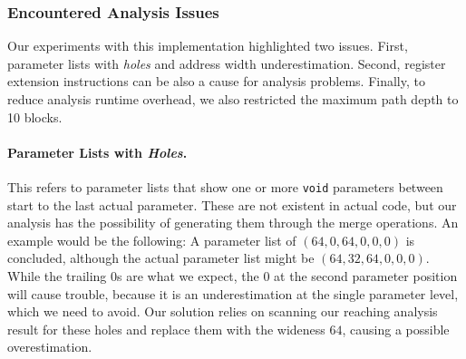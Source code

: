 %

\subsubsection{Encountered Analysis Issues}
Our experiments with this implementation highlighted two issues.
First, parameter lists with \textit{holes} and address width underestimation.
Second, register extension instructions can be also a cause for analysis problems. 
Finally, to reduce analysis runtime overhead, we also restricted the maximum path depth to 10 blocks.

\paragraph{Parameter Lists with \textit{Holes}.} This refers to parameter lists that show one or more \texttt{void} parameters between start to the last actual parameter. 
These are not existent in actual code, but our analysis has the possibility of generating them through the merge operations. An example would be the following: 
A parameter list of $(64, 0, 64, 0, 0, 0)$ is concluded, although the actual parameter list might be $(64, 32, 64, 0, 0, 0)$. While the trailing 0s are 
what we expect, the 0 at the second parameter position will cause trouble, because it is an underestimation at the single parameter level, which we need to avoid.
Our solution relies on scanning our reaching analysis result for these holes and replace them with the wideness $64$, causing a possible overestimation.

